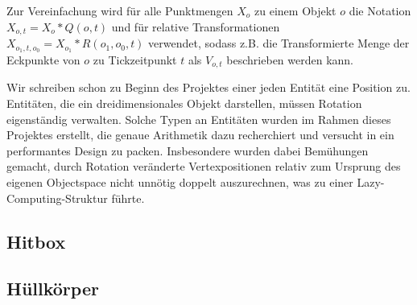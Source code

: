 Zur Vereinfachung wird für alle Punktmengen $X_o$ zu einem Objekt $o$ die Notation $X_{o, t} = X_o * Q(o, t)$ und für relative Transformationen $X_{o_1, t, o_0} = X_{o_1} * R(o_1, o_0, t)$ verwendet, sodass z.B. die Transformierte Menge der Eckpunkte von $o$ zu Tickzeitpunkt $t$ als $V_{o,t}$ beschrieben werden kann.

Wir schreiben schon zu Beginn des Projektes einer jeden Entität eine Position zu. Entitäten, die ein dreidimensionales Objekt darstellen, müssen Rotation eigenständig verwalten. Solche Typen an Entitäten wurden im Rahmen dieses Projektes erstellt, die genaue Arithmetik dazu recherchiert und versucht in ein performantes Design zu packen. Insbesondere wurden dabei Bemühungen gemacht, durch Rotation veränderte Vertexpositionen relativ zum Ursprung des eigenen Objectspace nicht unnötig doppelt auszurechnen, was zu einer Lazy-Computing-Struktur führte.

\subsection{Hitbox}

\subsection{Hüllkörper}


